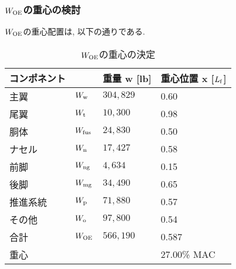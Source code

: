 \documentclass[12pt]{jsarticle}
\begin{document}
\subsubsection{$W_{\rm OE}$の重心の検討}
$W_{\rm OE}$の重心配置は, 以下の通りである.
\begin{table}[H]
	\caption{$W_{\rm OE}$の重心の決定}
	\begin{center}
		\begin{tabular}{p{2cm} p{2cm} p{3cm} p{3cm}} \hline
			コンポネント  & & 重量 w [lb] & 重心位置 x [$L_{\rm f}$] \\ \hline \hline
			主翼 & $W_{\rm w}$ & $304,829$ & 0.60 \\
			尾翼 & $W_{\rm t}$ & $10,300$ & 0.98 \\
			胴体 & $W_{\rm fus}$ & $24,830$ & 0.50 \\
			ナセル & $W_{\rm n}$ & $17,427$ & 0.58 \\
			前脚 & $W_{\rm ng}$ & $4,634$ & 0.15 \\
			後脚 & $W_{\rm mg}$ & $34,490$ & 0.65 \\
			推進系統 & $W_{\rm p}$ & $71,880$ & 0.57 \\
			その他 & $W_{\rm o}$ & $97,800$ & 0.54 \\ \hline
			合計 & $W_{\rm OE}$ & $566,190$ & 0.587 \\ \hline \hline
			重心 & & & 27.00\% MAC \\ \hline
		\end{tabular}
	\end{center}
\end{table}
\end{document}
